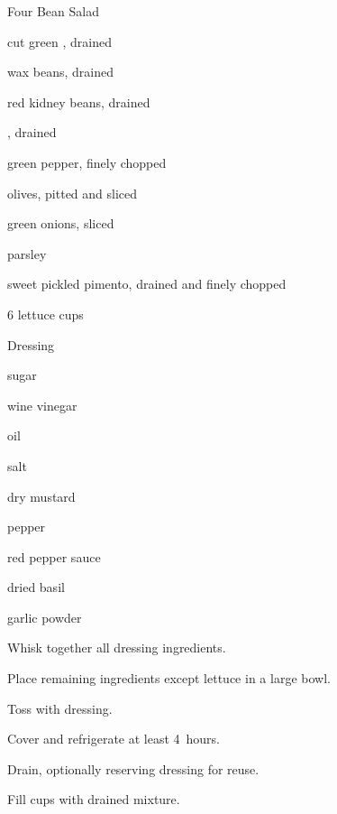 \begin{recipe}{Four Bean Salad}{}{}

\begin{ingredients}
\item {} cut green , drained
\item {} wax beans, drained
\item {} red kidney beans, drained
\item {} , drained
\item \C{\half} green pepper, finely chopped
\item \C{\half} olives, pitted and sliced
\item \C{\quarter} green onions, sliced
\item \C{\quarter} parsley
\item \C{\quarter} sweet pickled pimento, drained and finely chopped
\item 6 lettuce cups
\end{ingredients}
Dressing
\begin{ingredients}
\item \C{\half} sugar
\item \C{\half} wine vinegar
\item \C{\half} oil
\item \tp{1\half} salt
\item \tp{\half} dry mustard
\item \tp{\half} pepper
\item \tp{\half} red pepper sauce
\item \tp{\quarter} dried basil
\item \tp{\quarter} garlic powder
\end{ingredients}

\begin{directions}
\item Whisk together all dressing ingredients.
\item Place remaining ingredients except lettuce in a large bowl.
\item Toss with dressing.
\item Cover and refrigerate at least 4~hours.
\item Drain, optionally reserving dressing for reuse.
\item Fill cups with drained mixture.
\end{directions}

\end{recipe}
